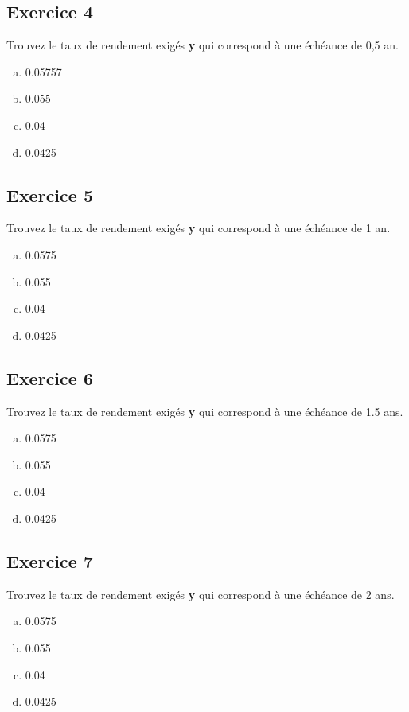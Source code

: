 \documentclass[10pt,a4paper]{article}
\begin{document}
\subsection*{Exercice 4}
Trouvez le taux de rendement exigés \textbf{y} qui correspond à une échéance de 0,5 an.

\begin{enumerate}[a)]
\item 0.05757
\item 0.055
\item 0.04
\item 0.0425
\end{enumerate}

\subsection*{Exercice 5}
Trouvez le taux de rendement exigés \textbf{y} qui correspond à une échéance de 1 an.

\begin{enumerate}[a)]
\item 0.0575
\item 0.055
\item 0.04
\item 0.0425
\end{enumerate}

\subsection*{Exercice 6}
Trouvez le taux de rendement exigés \textbf{y} qui correspond à une échéance de 1.5 ans.

\begin{enumerate}[a)]
\item 0.0575
\item 0.055
\item 0.04
\item 0.0425
\end{enumerate}

\subsection*{Exercice 7}
Trouvez le taux de rendement exigés \textbf{y} qui correspond à une échéance de 2 ans.

\begin{enumerate}[a)]
\item 0.0575
\item 0.055
\item 0.04
\item 0.0425
\end{enumerate}
\end{document}
